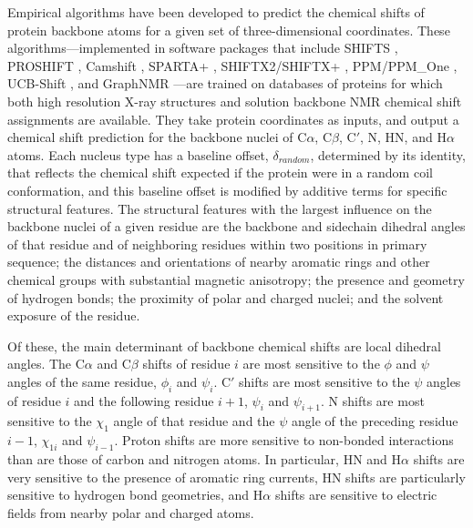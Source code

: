 \documentclass[9pt,review]{livecoms}
\begin{document}
Empirical algorithms have been developed to predict the chemical shifts of protein backbone atoms for a given set of three-dimensional coordinates.
These algorithms---implemented in software packages that include SHIFTS \cite{xu_automated_2001}, PROSHIFT \cite{meiler_proshift_2003}, Camshift \cite{kohlhoff_fast_2009}, SPARTA+ \cite{shen_sparta_2010}, SHIFTX2/SHIFTX+ \cite{han_shiftx2_2011}, PPM/PPM\_One \cite{li_ppm_2012,li_ppm_one_2015}, UCB-Shift \cite{li_accurate_2020}, and GraphNMR \cite{yang_predicting_2021}---are trained on databases of proteins for which both high resolution X-ray structures and solution backbone NMR chemical shift assignments are available.
They take protein coordinates as inputs, and output a chemical shift prediction for the backbone nuclei of C$\alpha$, C$\beta$, C$'$, N, HN, and H$\alpha$ atoms.
Each nucleus type has a baseline offset, $\delta_{random}$, determined by its identity, that reflects the chemical shift expected if the protein were in a random coil conformation, and this baseline offset is modified by additive terms for specific structural features.
The structural features with the largest influence on the backbone nuclei of a given residue are the backbone and sidechain dihedral angles of that residue and of neighboring residues within two positions in primary sequence; the distances and orientations of nearby aromatic rings and other chemical groups with substantial magnetic anisotropy; the presence and geometry of hydrogen bonds; the proximity of polar and charged nuclei; and the solvent exposure of the residue.

Of these, the main determinant of backbone chemical shifts are local dihedral angles.
The C$\alpha$ and C$\beta$ shifts of residue $i$ are most sensitive to the $\phi$ and $\psi$ angles of the same residue, $\phi_i$ and $\psi_i$.
C$'$ shifts are most sensitive to the $\psi$ angles of residue $i$ and the following residue $i+1$, $\psi_i$ and $\psi_{i+1}$.
N shifts are most sensitive to the $\chi_1$ angle of that residue and the $\psi$ angle of the preceding residue $i-1$, $\chi_{1i}$ and $\psi_{i-1}$.
Proton shifts are more sensitive to non-bonded interactions than are those of carbon and nitrogen atoms.
In particular, HN and H$\alpha$ shifts are very sensitive to the presence of aromatic ring currents, HN shifts are particularly sensitive to hydrogen bond geometries, and H$\alpha$ shifts are sensitive to electric fields from nearby polar and charged atoms.
\end{document}
